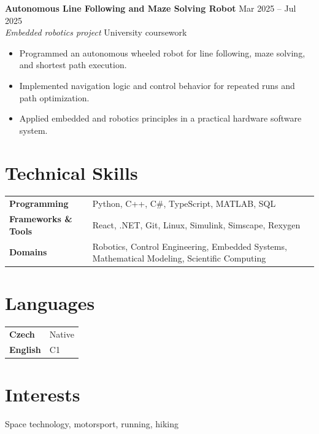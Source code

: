 \documentclass[11pt,a4paper]{article}
\newcommand{\entry}[4]{%
  \textbf{#1} \hfill {\small #2}\\
  {\textit{#3}} \hfill {\small\color{muted} #4}\\[-0.15em]
}
\begin{document}
\entry{Autonomous Line Following and Maze Solving Robot}{Mar 2025 -- Jul 2025}{Embedded robotics project}{University coursework}
\begin{itemize}
  \item Programmed an autonomous wheeled robot for line following, maze solving, and shortest path execution.
  \item Implemented navigation logic and control behavior for repeated runs and path optimization.
  \item Applied embedded and robotics principles in a practical hardware software system.
\end{itemize}

\section*{Technical Skills}
\begin{tabularx}{\textwidth}{@{}>{\bfseries}p{3.5cm}X@{}}
Programming & Python, C++, C\#, TypeScript, MATLAB, SQL \\
Frameworks \& Tools & React, .NET, Git, Linux, Simulink, Simscape, Rexygen \\
Domains & Robotics, Control Engineering, Embedded Systems, Mathematical Modeling, Scientific Computing \\
\end{tabularx}

\section*{Languages}
\begin{tabularx}{\textwidth}{@{}>{\bfseries}p{3.5cm}X@{}}
Czech & Native \\
English & C1 \\
\end{tabularx}

\section*{Interests}
Space technology, motorsport, running, hiking
\end{document}
